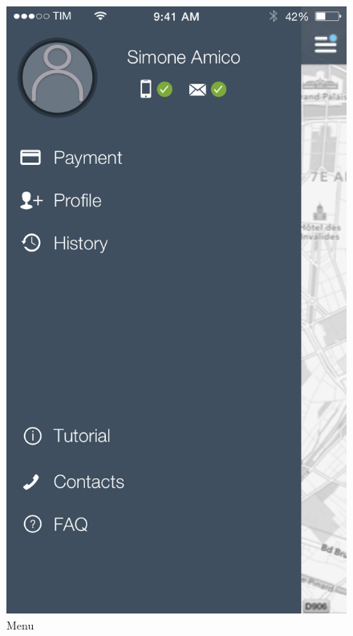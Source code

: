 \documentclass[12pt]{article}
\begin{document}
\begin{figure}
 	 	  \includegraphics[scale=0.25]{Images/Menu.png}
		  \caption{Menu}
		  \endminipage
 	 	\end{figure}
 	 	
		
	 	 
\end{document}
